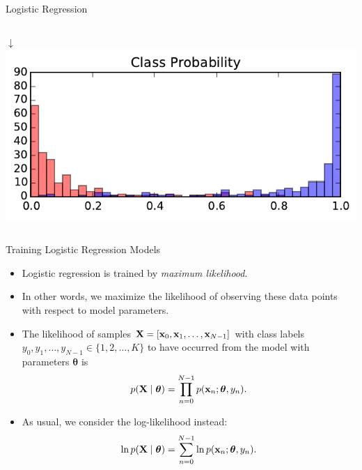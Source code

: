 \documentclass[10pt, aspectratio=169]{beamer} %
\newcommand{\thb}{\boldsymbol{\theta}}
\newcommand{\X}{{\bf X}}
\newcommand{\x}{{\bf x}}
\begin{document}
\begin{frame}{Logistic Regression}
\begin{columns}[onlytextwidth]
\begin{center}
	\vspace*{-0.2cm}$\downarrow$\\
	\includegraphics[width=\textwidth]{LR_prob.pdf}
\end{center}
\end{columns}
\end{frame}

\begin{frame}{Training Logistic Regression Models}
\begin{itemize}
\item Logistic regression is trained by \emph{maximum likelihood}.
\item In other words, we maximize the likelihood of observing these
data points with respect to model parameters.
\item The likelihood of samples $\X = [\x_0, \x_1, \ldots, \x_{N-1}]$ with class labels
$y_0, y_1,\ldots, y_{N-1} \in \{1,2,\ldots, K\}$ to have occurred from
the model with parameters $\thb$ is
\[
p(\X \mid \thb) = \prod_{n = 0}^{N-1} p(\x_n; \thb, y_n).
\]
\item As usual, we consider the log-likelihood instead:
\[
\ln p(\X \mid \thb) = \sum_{n = 0}^{N-1} \ln p(\x_n; \thb, y_n).
\]
\end{itemize}
\end{frame}
\end{document}
